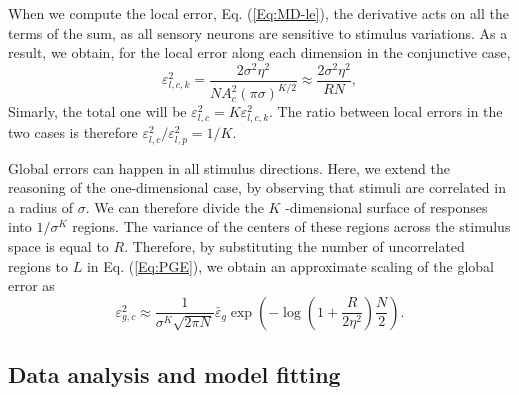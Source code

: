 \documentclass[a4paper]{article}%
\begin{document}
When we compute the local error, Eq. (\ref{Eq:MD-le}), the derivative acts on
all the terms of the sum, as all sensory neurons are sensitive to stimulus
variations. As a result, we obtain, for the local error along each dimension
in the conjunctive case,
\begin{equation}
\varepsilon_{l,c,k}^{2} = \frac{2 \sigma^{2} \eta^{2}}{ NA_{c}^{2} (\pi
\sigma)^{K/2}} \approx\frac{2\sigma^{2} \eta^{2}}{RN},
\label{Eq:multi-local-conj}%
\end{equation}
Simarly, the total one will be $\varepsilon^{2}_{l,c} = K\varepsilon
_{l,c,k}^{2}$. The ratio between local errors in the two cases is therefore
$\varepsilon_{l,c}^{2} /\varepsilon^{2}_{l,p} = 1/K$.

Global errors can happen in all stimulus directions. Here, we extend the
reasoning of the one-dimensional case, by observing that stimuli are
correlated in a radius of $\sigma$. We can therefore divide the $K$%
-dimensional surface of responses into $1/\sigma^{K}$ regions. The variance of
the centers of these regions across the stimulus space is equal to $R$.
Therefore, by substituting the number of uncorrelated regions to $L$ in Eq.
(\ref{Eq:PGE}), we obtain an approximate scaling of the global error as
\begin{equation}
\varepsilon_{g,c}^{2} \approx\frac{1}{\sigma^{K}\sqrt{2\pi N}}\bar
{\varepsilon}_{g} \exp{\left(  -\log\left(  1 + \frac{R}{2\eta^{2}}\right)
\frac{N}{2} \right)  }. \label{Eq:multi-global-conj}%
\end{equation}


\subsection*{Data analysis and model fitting}
\end{document}
